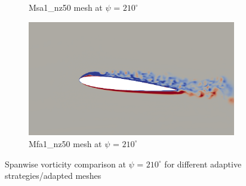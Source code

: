 \begin{figure}[H]
\begin{subfigure}[b]{0.475\textwidth}
\caption{Msa1\_nz50 mesh at $\psi$ = $210^\circ$}
\label{fig:hadapt_psi210}
\end{subfigure}
\begin{subfigure}[b]{0.475\textwidth}
\centering
\includegraphics[width=1\textwidth]{figures/adapt_strat/vorticity_plots/Mfa1_50/phase_210.png}
\caption{Mfa1\_nz50 mesh at $\psi$ = $210^\circ$}
\label{fig:FB_psi210}
\end{subfigure}
\caption{Spanwise vorticity comparison at $\psi$ = $210^\circ$ for different adaptive strategies/adapted meshes}
\label{fig:vorticity_210}
\end{figure}



